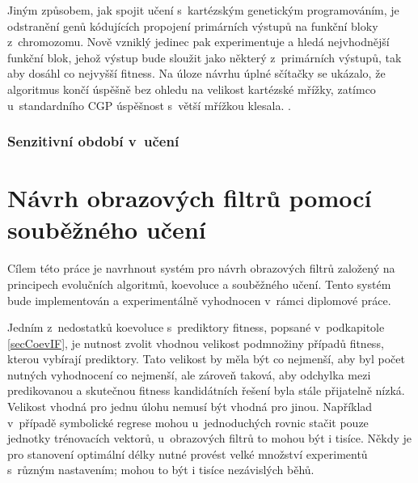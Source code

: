 Jiným způsobem, jak spojit učení s~kartézským genetickým programováním, je odstranění genů kódujících  propojení primárních výstupů na funkční bloky z~chromozomu. Nově vzniklý jedinec pak experimentuje a hledá nejvhodnější funkční blok, jehož výstup bude sloužit jako některý z~primárních výstupů, tak aby dosáhl co nejvyšší fitness. Na úloze návrhu úplné sčítačky se ukázalo, že algoritmus končí úspěšně bez ohledu na velikost kartézské mřížky, zatímco u~standardního CGP úspěšnost s~větší mřížkou klesala. \cite{KhatirPlasticCGP}.

\subsection{Senzitivní období v~učení}

\blind
\blind




\chapter{Návrh obrazových filtrů pomocí souběžného učení}

Cílem této práce je navrhnout systém pro návrh obrazových filtrů založený na principech evolučních algoritmů, koevoluce a souběžného učení. Tento systém bude implementován a experimentálně vyhodnocen v~rámci diplomové práce.

Jedním z~nedostatků koevoluce s~prediktory fitness, popsané v~podkapitole \ref{secCoevIF}, je nutnost zvolit vhodnou velikost podmnožiny případů fitness, kterou vybírají prediktory. Tato velikost by měla být co nejmenší, aby byl počet nutných vyhodnocení co nejmenší, ale zároveň taková, aby odchylka mezi predikovanou a skutečnou fitness kandidátních řešení byla stále přijatelně nízká. Velikost vhodná pro jednu úlohu nemusí být vhodná pro jinou. Například v~případě symbolické regrese mohou u~jednoduchých rovnic stačit pouze jednotky trénovacích vektorů, u~obrazových filtrů to mohou být i tisíce. Někdy je pro stanovení optimální délky nutné provést velké množství experimentů s~různým nastavením; mohou to být i tisíce nezávislých běhů.

